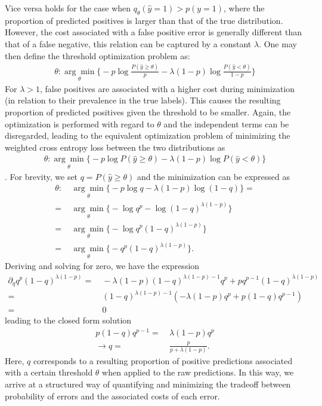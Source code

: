 \documentclass{article}
\begin{document}
Vice versa holds for the case when $q_\theta(\hat{y}=1) > p(y=1)$, where the proportion of predicted positives is larger than that of the true distribution.
However, the cost associated with a false positive error is generally different than that of a false negative, this relation can be captured by a constant $\lambda$. One may then define the threshold optimization problem as:  
\begin{align}
    \theta: \underset{\theta}{\arg \min} \Big\{ - p \log \frac{P(\hat{y}\geq \theta)}{p} - \lambda (1-p) \log \frac{P(\hat{y} < \theta)}{1-p} \Big \}
\end{align}
For $\lambda>1$, false positives are associated with a higher cost during minimization (in relation to their prevalence in the true labels). This causes the resulting proportion of predicted positives given the threshold to be smaller. %
Again, the optimization is performed with regard to $\theta$ and the independent terms can be disregarded, leading to the equivalent optimization problem of minimizing the weighted cross entropy loss between the two distributions as
\begin{align}
\label{eq:threshold} 
\theta: \underset{\theta}{\arg \min} \Big\{ - p \log P(\hat{y}\geq \theta) - \lambda (1-p) \log P(\hat{y} < \theta) \Big \} 
\end{align}.
For brevity, we set $q = P(\hat{y}\geq \theta)$ and the minimization can be expressed as
\begin{align*}
\theta:& \ \underset{\theta}{\arg \min} \Big\{ - p \log q - \lambda (1-p) \log (1-q) \Big \} = \\
=& \ \underset{\theta}{\arg \min} \Big\{ - \log q^p - \log (1-q)^{\lambda(1-p)} \Big \} \\
=& \ \underset{\theta}{\arg \min} \Big\{ - \log q^p (1-q)^{\lambda(1-p)} \Big \} \\
=& \ \underset{\theta}{\arg \min} \Big\{ - q^p (1-q)^{\lambda(1-p)} \Big \} \text{.}
\end{align*}
Deriving and solving for zero, we have the expression
\begin{align*}
\partial_q q^p (1-q)^{\lambda(1-p)} =& \ -\lambda(1-p)(1-q)^{\lambda(1-p)-1}q^p + pq^{p-1}(1-q)^{\lambda(1-p)} \\
=& \ (1-q)^{\lambda(1-p)-1}(-\lambda(1-p)q^p + p(1-q)q^{p-1}) \\
=& \ 0
\end{align*}
leading to the closed form solution
\begin{align}
p(1-q)q^{p-1} =& \ \lambda(1-p)q^p \\
\rightarrow q =& \ \frac{p}{p + \lambda(1-p)}\text{.}
\label{eq:pos}
\end{align}
Here, $q$ corresponds to a resulting proportion of positive predictions associated with a certain threshold $\theta$ when applied to the raw predictions.
In this way, we arrive at a structured way of quantifying and minimizing the tradeoff between probability of errors and the associated costs of each error.
\end{document}
